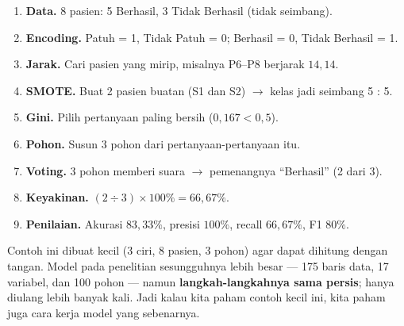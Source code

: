 \documentclass[11pt,a4paper]{article}
\begin{document}
\begin{enumerate}[leftmargin=*]
  \item \textbf{Data.} 8 pasien: 5 Berhasil, 3 Tidak Berhasil (tidak seimbang).
  \item \textbf{Encoding.} Patuh = 1, Tidak Patuh = 0; Berhasil = 0, Tidak Berhasil = 1.
  \item \textbf{Jarak.} Cari pasien yang mirip, misalnya P6--P8 berjarak $14{,}14$.
  \item \textbf{SMOTE.} Buat 2 pasien buatan (S1 dan S2) $\to$ kelas jadi seimbang 5 : 5.
  \item \textbf{Gini.} Pilih pertanyaan paling bersih ($0{,}167 < 0{,}5$).
  \item \textbf{Pohon.} Susun 3 pohon dari pertanyaan-pertanyaan itu.
  \item \textbf{Voting.} 3 pohon memberi suara $\to$ pemenangnya ``Berhasil'' (2 dari 3).
  \item \textbf{Keyakinan.} $(2 \div 3) \times 100\% = 66{,}67\%$.
  \item \textbf{Penilaian.} Akurasi $83{,}33\%$, presisi $100\%$, recall $66{,}67\%$, F1 $80\%$.
\end{enumerate}

\begin{catatan}
Contoh ini dibuat kecil (3 ciri, 8 pasien, 3 pohon) agar dapat dihitung dengan tangan.
Model pada penelitian sesungguhnya lebih besar --- 175 baris data, 17 variabel, dan 100 pohon
--- namun \textbf{langkah-langkahnya sama persis}; hanya diulang lebih banyak kali. Jadi kalau
kita paham contoh kecil ini, kita paham juga cara kerja model yang sebenarnya.
\end{catatan}
\end{document}
